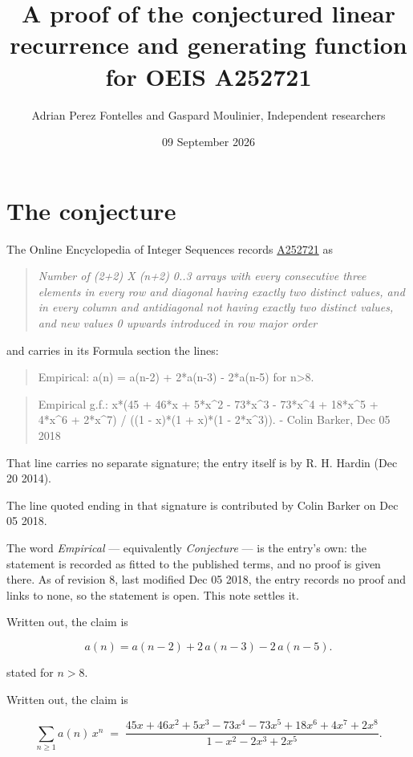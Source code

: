 \documentclass[11pt]{article}
\title{A proof of the conjectured linear recurrence and generating function for OEIS A252721}
\author{Adrian Perez Fontelles and Gaspard Moulinier, Independent researchers}
\date{09 September 2026}
\theoremstyle{definition}
\begin{document}
\maketitle
\section{The conjecture}

The Online Encyclopedia of Integer Sequences records \href{https://oeis.org/A252721}{A252721} as

\begin{quote}\itshape Number of (2+2) X (n+2) 0..3 arrays with every consecutive three elements in every row and diagonal having exactly two distinct values, and in every column and antidiagonal not having exactly two distinct values, and new values 0 upwards introduced in row major order\end{quote}

and carries in its Formula section the lines:

\begin{quote}\ttfamily Empirical: a(n) = a(n-2) + 2*a(n-3) - 2*a(n-5) for n>8.\end{quote}

\begin{quote}\ttfamily Empirical g.f.: x*(45 + 46*x + 5*x\textasciicircum{}2 - 73*x\textasciicircum{}3 - 73*x\textasciicircum{}4 + 18*x\textasciicircum{}5 + 4*x\textasciicircum{}6 + 2*x\textasciicircum{}7) / ((1 - x)*(1 + x)*(1 - 2*x\textasciicircum{}3)). - Colin Barker, Dec 05 2018\end{quote}

That line carries no separate signature; the entry itself is by R. H. Hardin (Dec 20 2014).

The line quoted ending in that signature is contributed by Colin Barker on Dec 05 2018.

The word {\itshape Empirical} --- equivalently {\itshape Conjecture} --- is the entry's own: the statement is recorded as fitted to the published terms, and no proof is given there. As of revision 8, last modified Dec 05 2018, the entry records no proof and links to none, so the statement is open. This note settles it.

Written out, the claim is

\[a(n) = a(n-2) + 2\,a(n-3) - 2\,a(n-5).\]

stated for $n > 8$.

Written out, the claim is

\[\sum_{n \ge 1} a(n)\,x^n \;=\; \frac{45x + 46x^{2} + 5x^{3} - 73x^{4} - 73x^{5} + 18x^{6} + 4x^{7} + 2x^{8}}{1 - x^{2} - 2x^{3} + 2x^{5}}.\]
\end{document}
